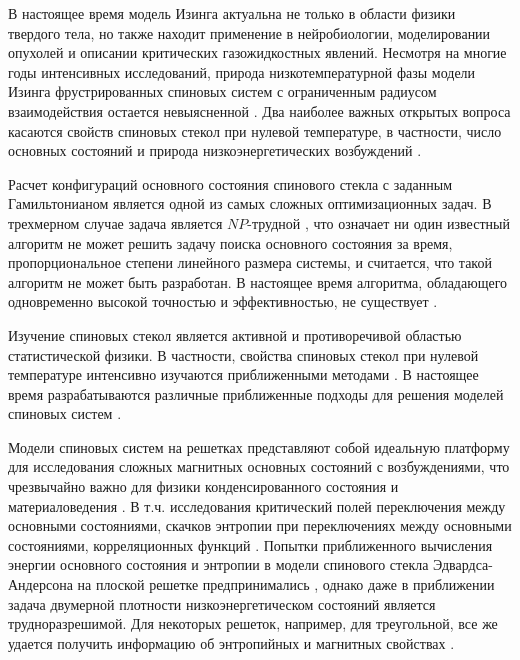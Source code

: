 \documentclass[utf8, babel, sor, jor, amsmath, amssymb, reprint]{elsarticle} %
\begin{document}
В настоящее время модель Изинга актуальна не только в области физики твердого тела, но также находит применение в нейробиологии, моделировании опухолей и описании критических газожидкостных явлений. Несмотря на многие годы интенсивных исследований, природа низкотемпературной фазы модели Изинга фрустрированных спиновых систем с ограниченным радиусом взаимодействия остается невыясненной \cite{newman2023proof}. Два наиболее важных открытых вопроса касаются свойств спиновых стекол при нулевой температуре, в частности, число основных состояний и природа низкоэнергетических возбуждений \cite{newman2022ground}.  

Расчет конфигураций основного состояния спинового стекла с заданным Гамильтонианом является одной из самых сложных оптимизационных задач. В трехмерном случае задача является $NP$-трудной \cite{barahona1982computational, hartmann2002optimization}, что означает ни один известный алгоритм не может решить задачу поиска основного состояния за время, пропорциональное степени линейного размера системы, и считается, что такой алгоритм не может быть разработан. В настоящее время алгоритма, обладающего одновременно высокой точностью и эффективностью, не существует \cite{fan2023searching}.

Изучение спиновых стекол является активной и противоречивой областью статистической физики. В частности, свойства спиновых стекол при нулевой температуре интенсивно изучаются приближенными методами \cite{perez2012ground}. В настоящее время разрабатываются различные приближенные подходы для решения моделей спиновых систем \cite{farias2024differentiable, rybin2022hybrid, makarova2023canonical}. 

Модели спиновых систем на решетках представляют собой идеальную платформу для исследования сложных магнитных основных состояний с возбуждениями, что чрезвычайно важно для физики конденсированного состояния и материаловедения \cite{lacroix2011introduction}. В т.ч. исследования критический полей переключения между основными состояниями, скачков энтропии при переключениях между основными состояниями, корреляционных функций \cite{ramirez2004effect, rosas2004random, andriushchenko2019large}. Попытки приближенного вычисления энергии основного состояния и энтропии в модели спинового стекла Эдвардса-Андерсона на плоской решетке предпринимались \cite{perez2012ground}, однако даже в приближении задача двумерной плотности низкоэнергетическом состояний является трудноразрешимой. Для некоторых решеток, например, для треугольной, все же удается получить информацию об энтропийных и магнитных свойствах \cite{jurvcivsinova2024classical}.
\end{document}
